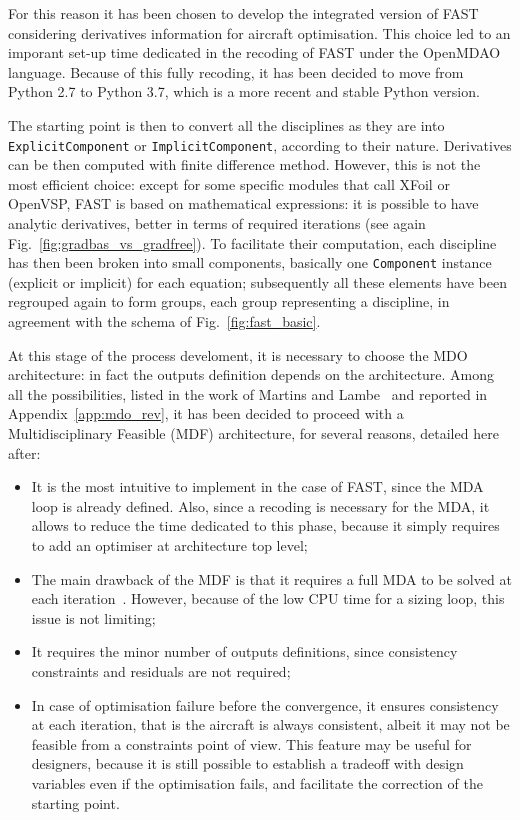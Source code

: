 For this reason it has been chosen to develop the integrated version of FAST considering derivatives information for aircraft optimisation.
This choice led to an imporant set-up time dedicated in the recoding of FAST under the OpenMDAO language. 
Because of this fully recoding, it has been decided to move from Python 2.7 to Python 3.7, which is a more recent and stable Python version. 

The starting point is then to convert all the disciplines as they are into \texttt{ExplicitComponent} or \texttt{ImplicitComponent}, according to their nature. 
Derivatives can be then computed with finite difference method. 
However, this is not the most efficient choice: except for some specific modules that call XFoil or OpenVSP, FAST is based on mathematical expressions: it is possible to have analytic derivatives, better in terms of required iterations (see again Fig.~\ref{fig:gradbas_vs_gradfree}). 
To facilitate their computation, each discipline has then been broken into small components, basically one \texttt{Component} instance (explicit or implicit) for each equation; subsequently all these elements have been regrouped again to form groups, each group representing a discipline, in agreement with the schema of Fig.~\ref{fig:fast_basic}.

At this stage of the process develoment, it is necessary to choose the MDO architecture: in fact the outputs definition depends on the architecture. 
Among all the possibilities, listed in the work of Martins and Lambe~\cite{bib:martins_mdo} and reported in Appendix~\ref{app:mdo_rev}, it has been decided to proceed with a Multidisciplinary Feasible (MDF) architecture, for several reasons, detailed here after:
\begin{itemize}
	
	\item It is the most intuitive to implement in the case of FAST, since the MDA loop is already defined. Also, since a recoding is necessary for the MDA, it allows to reduce the time dedicated to this phase, because it simply requires to add an optimiser at architecture top level;
	
	\item The main drawback of the MDF is that it requires a full MDA to be solved at each iteration~\cite{bib:martins_mdo}. However, because of the low CPU time for a sizing loop, this issue is not limiting;
	
	\item It requires the minor number of outputs definitions, since consistency constraints and residuals are not required;
	
	\item In case of optimisation failure before the convergence, it ensures consistency at each iteration, that is the aircraft is always consistent, albeit it may not be feasible from a constraints point of view.
	This feature may be useful for designers, because it is still possible to establish a tradeoff with design variables even if the optimisation fails, and facilitate the correction of the starting point. 
\end{itemize}

